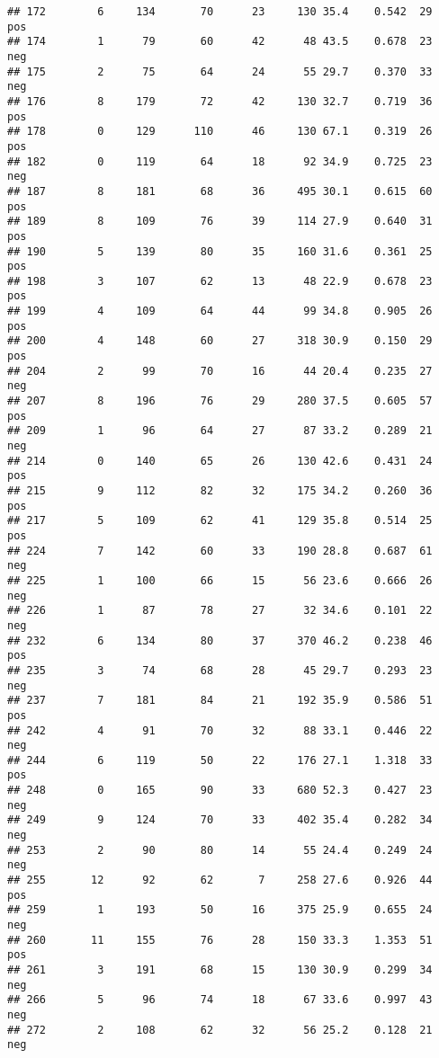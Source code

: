 \documentclass[
]{article}
\begin{document}
\begin{verbatim}
## 172        6     134       70      23     130 35.4    0.542  29      pos
## 174        1      79       60      42      48 43.5    0.678  23      neg
## 175        2      75       64      24      55 29.7    0.370  33      neg
## 176        8     179       72      42     130 32.7    0.719  36      pos
## 178        0     129      110      46     130 67.1    0.319  26      pos
## 182        0     119       64      18      92 34.9    0.725  23      neg
## 187        8     181       68      36     495 30.1    0.615  60      pos
## 189        8     109       76      39     114 27.9    0.640  31      pos
## 190        5     139       80      35     160 31.6    0.361  25      pos
## 198        3     107       62      13      48 22.9    0.678  23      pos
## 199        4     109       64      44      99 34.8    0.905  26      pos
## 200        4     148       60      27     318 30.9    0.150  29      pos
## 204        2      99       70      16      44 20.4    0.235  27      neg
## 207        8     196       76      29     280 37.5    0.605  57      pos
## 209        1      96       64      27      87 33.2    0.289  21      neg
## 214        0     140       65      26     130 42.6    0.431  24      pos
## 215        9     112       82      32     175 34.2    0.260  36      pos
## 217        5     109       62      41     129 35.8    0.514  25      pos
## 224        7     142       60      33     190 28.8    0.687  61      neg
## 225        1     100       66      15      56 23.6    0.666  26      neg
## 226        1      87       78      27      32 34.6    0.101  22      neg
## 232        6     134       80      37     370 46.2    0.238  46      pos
## 235        3      74       68      28      45 29.7    0.293  23      neg
## 237        7     181       84      21     192 35.9    0.586  51      pos
## 242        4      91       70      32      88 33.1    0.446  22      neg
## 244        6     119       50      22     176 27.1    1.318  33      pos
## 248        0     165       90      33     680 52.3    0.427  23      neg
## 249        9     124       70      33     402 35.4    0.282  34      neg
## 253        2      90       80      14      55 24.4    0.249  24      neg
## 255       12      92       62       7     258 27.6    0.926  44      pos
## 259        1     193       50      16     375 25.9    0.655  24      neg
## 260       11     155       76      28     150 33.3    1.353  51      pos
## 261        3     191       68      15     130 30.9    0.299  34      neg
## 266        5      96       74      18      67 33.6    0.997  43      neg
## 272        2     108       62      32      56 25.2    0.128  21      neg

\end{verbatim}
\end{document}
